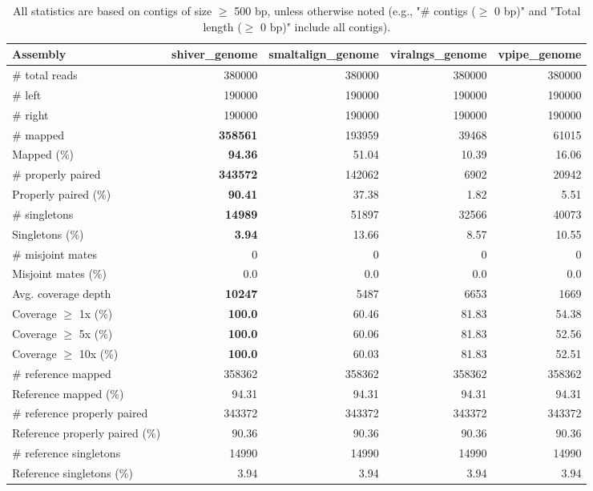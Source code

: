 \documentclass[12pt,a4paper]{article}
\begin{document}
\begin{table}[ht]
\begin{center}
\caption{All statistics are based on contigs of size $\geq$ 500 bp, unless otherwise noted (e.g., "\# contigs ($\geq$ 0 bp)" and "Total length ($\geq$ 0 bp)" include all contigs).}
\begin{tabular}{|l*{4}{|r}|}
\hline
Assembly & shiver\_genome & smaltalign\_genome & viralngs\_genome & vpipe\_genome \\ \hline
\# total reads & 380000 & 380000 & 380000 & 380000 \\ \hline
\# left & 190000 & 190000 & 190000 & 190000 \\ \hline
\# right & 190000 & 190000 & 190000 & 190000 \\ \hline
\# mapped & {\bf 358561} & 193959 & 39468 & 61015 \\ \hline
Mapped (\%) & {\bf 94.36} & 51.04 & 10.39 & 16.06 \\ \hline
\# properly paired & {\bf 343572} & 142062 & 6902 & 20942 \\ \hline
Properly paired (\%) & {\bf 90.41} & 37.38 & 1.82 & 5.51 \\ \hline
\# singletons & {\bf 14989} & 51897 & 32566 & 40073 \\ \hline
Singletons (\%) & {\bf 3.94} & 13.66 & 8.57 & 10.55 \\ \hline
\# misjoint mates & 0 & 0 & 0 & 0 \\ \hline
Misjoint mates (\%) & 0.0 & 0.0 & 0.0 & 0.0 \\ \hline
Avg. coverage depth & {\bf 10247} & 5487 & 6653 & 1669 \\ \hline
Coverage $\geq$ 1x (\%) & {\bf 100.0} & 60.46 & 81.83 & 54.38 \\ \hline
Coverage $\geq$ 5x (\%) & {\bf 100.0} & 60.06 & 81.83 & 52.56 \\ \hline
Coverage $\geq$ 10x (\%) & {\bf 100.0} & 60.03 & 81.83 & 52.51 \\ \hline
\# reference mapped & 358362 & 358362 & 358362 & 358362 \\ \hline
Reference mapped (\%) & 94.31 & 94.31 & 94.31 & 94.31 \\ \hline
\# reference properly paired & 343372 & 343372 & 343372 & 343372 \\ \hline
Reference properly paired (\%) & 90.36 & 90.36 & 90.36 & 90.36 \\ \hline
\# reference singletons & 14990 & 14990 & 14990 & 14990 \\ \hline
Reference singletons (\%) & 3.94 & 3.94 & 3.94 & 3.94 \\ \hline

\end{tabular}
\end{center}
\end{table}
\end{document}
